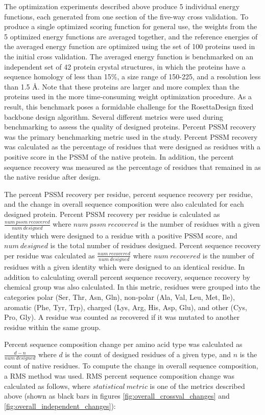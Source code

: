 The optimization experiments described above produce 5 individual energy functions, each generated from one section of the five-way cross validation.
To produce a single optimized scoring function for general use, the weights from the 5 optimized energy functions are averaged together, and the reference energies of the averaged energy function are optimized using the set of 100 proteins used in the initial  cross validation.
The averaged energy function is benchmarked on an independent set of 42 protein crystal structures, in which the proteins have a sequence homology of less than 15\%, a size range of 150-225, and a resolution less than 1.5 \AA.
Note that these proteins are larger and more complex than the proteins used in the more time-consuming weight optimization procedure.
As a result, this benchmark poses a formidable challenge for the RosettaDesign fixed backbone design algorithm.
Several different metrics were used during benchmarking to assess the quality of designed proteins.
Percent \ac{PSSM} recovery was the primary benchmarking metric used in the study.
Percent \ac{PSSM} recovery was calculated as the percentage of residues that were designed as residues with a positive score in the \ac{PSSM} of the native protein.
In addition, the percent sequence recovery was measured as the percentage of residues that remained in as the native residue after design. 

The percent \ac{PSSM} recovery per residue, percent sequence recovery per residue, and the change in overall sequence composition were also calculated for each designed protein.
Percent \ac{PSSM} recovery per residue is calculated as $\frac{num\ pssm\ recovered}{num\ designed}$ where $num\ pssm\ recovered$ is the number of residues with a given identity which were designed to a residue with a positive \ac{PSSM} score, and $num\ designed$ is the total number of residues designed. 
Percent sequence recovery per residue was calculated as $\frac{num\ recovered}{num\ designed}$ where $num\ recovered$ is the number of residues with a given identity which were designed to an identical residue.
In addition to calculating overall percent sequence recovery, sequence recovery by chemical group was also calculated.
In this metric, residues were grouped into the categories polar (Ser, Thr, Asn, Gln), non-polar (Ala, Val, Leu, Met, Ile), aromatic (Phe, Tyr, Trp), charged (Lys, Arg, His, Asp, Glu), and other (Cys, Pro, Gly). 
A residue was counted as recovered if it was mutated to another residue within the same group.

Percent sequence composition change per amino acid type was calculated as $\frac{d-n}{num\ designed}$ where $d$ is the count of designed residues of a given type, and $n$ is the count of native residues.
To compute the change in overall sequence composition, a \ac{RMS} method was used.
\ac{RMS} percent sequence composition change was calculated as follows, where $statistical\ metric$ is one of the metrics described above (shown as black bars in figures \ref{fig:overall_crossval_changes} and \ref{fig:overall_independent_changes}):

